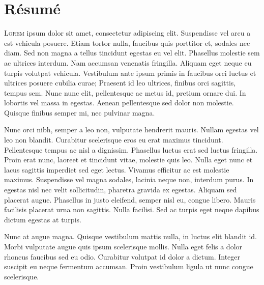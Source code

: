\chapter*{Résumé}
{\fontsize{11.45pt}{13.5pt}\selectfont 
\lettrine[lines=2]{L}{orem} ipsum dolor sit amet, consectetur adipiscing elit. Suspendisse vel arcu a est vehicula posuere. Etiam tortor nulla, faucibus quis porttitor et, sodales nec diam. Sed non magna a tellus tincidunt egestas eu vel elit. Phasellus molestie sem ac ultrices interdum. Nam accumsan venenatis fringilla. Aliquam eget neque eu turpis volutpat vehicula. Vestibulum ante ipsum primis in faucibus orci luctus et ultrices posuere cubilia curae; Praesent id leo ultrices, finibus orci sagittis, tempus sem. Nunc nunc elit, pellentesque ac metus id, pretium ornare dui. In lobortis vel massa in egestas. Aenean pellentesque sed dolor non molestie. Quisque finibus semper mi, nec pulvinar magna.

Nunc orci nibh, semper a leo non, vulputate hendrerit mauris. Nullam egestas vel leo non blandit. Curabitur scelerisque eros eu erat maximus tincidunt. Pellentesque tempus ac nisl a dignissim. Phasellus luctus erat sed luctus fringilla. Proin erat nunc, laoreet et tincidunt vitae, molestie quis leo. Nulla eget nunc et lacus sagittis imperdiet sed eget lectus. Vivamus efficitur ac est molestie maximus. Suspendisse vel magna sodales, lacinia neque non, interdum purus. In egestas nisl nec velit sollicitudin, pharetra gravida ex egestas. Aliquam sed placerat augue. Phasellus in justo eleifend, semper nisl eu, congue libero. Mauris facilisis placerat urna non sagittis. Nulla facilisi. Sed ac turpis eget neque dapibus dictum egestas at turpis.

Nunc at augue magna. Quisque vestibulum mattis nulla, in luctus elit blandit id. Morbi vulputate augue quis ipsum scelerisque mollis. Nulla eget felis a dolor rhoncus faucibus sed eu odio. Curabitur volutpat id dolor a dictum. Integer suscipit eu neque fermentum accumsan. Proin vestibulum ligula ut nunc congue scelerisque.
}

{}
\setcounter{tocdepth}{1}
\dominitoc \tableofcontents




